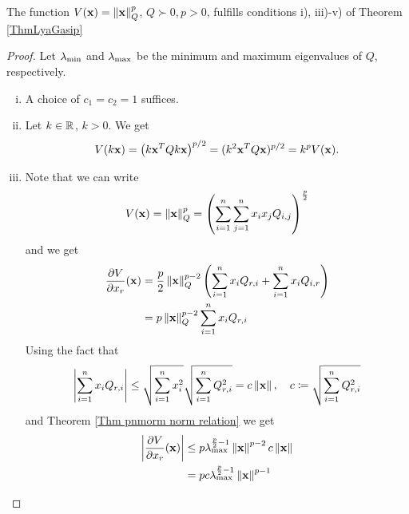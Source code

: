 \documentclass[a4paper,12pt,twoside,BCOR=10mm]{scrbook}
\begin{document}
\begin{theorem}
The function $V(\mathbf{x}) = \left\lVert\mathbf{x}\right\rVert_Q^p$, $Q\succ 0, p > 0$, fulfills conditions i), iii)-v) of Theorem \ref{ThmLyaGasip}
\end{theorem}
\begin{proof}
Let $\lambda_{\min}$ and $\lambda_{\max}$ be the minimum and maximum eigenvalues of $Q$, respectively.
\begin{enumerate}[i)]
    \item A choice of $c_1 = c_2 = 1$ suffices.
\setcounter{enumi}{2}
    \item Let $k\in\mathbb{R}^{}$, $k > 0$. We get
        \begin{align*}
            V(k\mathbf{x}) = \left(k\mathbf{x}^TQk\mathbf{x}\right)^{p/2} = (k^2 \mathbf{x}^T Q \mathbf{x})^{p / 2} = k^p V(\mathbf{x}).
        \end{align*}
    \item Note that we can write
        \begin{align*}
            V(\mathbf{x}) = \left\lVert\mathbf{x}\right\rVert_Q^p = \left(\sum_{i = 1}^n \sum_{j = 1}^n x_ix_j Q_{i, j}\right)^\frac{p}{2}
        \end{align*}
        and we get
        \begin{align*}
            \frac{\partial V}{\partial x_r} (\mathbf{x}) &= \frac{p}{2}\left\lVert\mathbf{x}\right\rVert_{Q}^{p - 2} \left(\sum_{i = 1}^n x_i Q_{r, i} + \sum_{i = 1}^n x_i Q_{i, r}\right)\\
            &= p\left\lVert\mathbf{x}\right\rVert_{Q}^{p - 2} \sum_{i = 1}^n x_i Q_{r,i}\\
        \end{align*}
        \fi
        Using the fact that
        \begin{align*}
            \left\lvert \sum_{i = 1}^n x_i Q_{r,i} \right\rvert \leq \sqrt{\sum\limits_{i = 1}^nx_i^2}\sqrt{\sum\limits_{i = 1}^n Q_{r,i}^2} = c\left\lVert\mathbf{x}\right\rVert, \quad c \coloneqq \sqrt{\sum\limits_{i = 1}^n Q_{r,i}^2}
        \end{align*}
        and Theorem \ref{Thm pnmorm norm relation} we get
        \begin{align*}
            \left | \frac{\partial V}{\partial x_r}(\x) \right | &\leq p\lambdamax^{\frac{p}{2} - 1} \norm{\x}^{p - 2}c\norm{\x}\\
            &= pc\lambdamax^{\frac{p}{2}-1}\norm{\x}^{p-1}\\

\end{align*}
\end{enumerate}
\end{proof}
\end{document}
